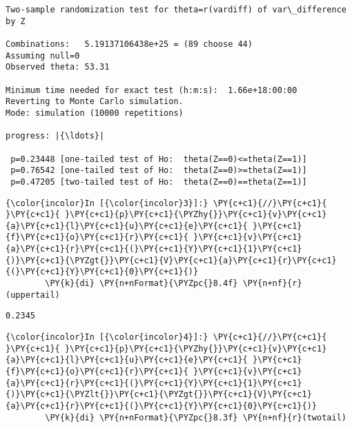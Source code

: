 \documentclass[11pt,notitlepage]{article}\usepackage[]{graphicx}\usepackage[]{color}
\makeatletter
\newenvironment{kframe}{%
 \def\at@end@of@kframe{}%
 \ifinner\ifhmode%
  \def\at@end@of@kframe{\end{minipage}}%
  \begin{minipage}{\columnwidth}%
 \fi\fi%
 \def\FrameCommand##1{\hskip\@totalleftmargin \hskip-\fboxsep
 \colorbox{shadecolor}{##1}\hskip-\fboxsep
     \hskip-\linewidth \hskip-\@totalleftmargin \hskip\columnwidth}%
 \MakeFramed {\advance\hsize-\width
   \@totalleftmargin\z@ \linewidth\hsize
   \@setminipage}}%
 {\par\unskip\endMakeFramed%
 \at@end@of@kframe}
\newenvironment{knitrout}{}{} %
\makeatother
\begin{document}
\begin{enumerate}[a)]
\begin{knitrout}
\begin{kframe}
    \begin{Verbatim}[commandchars=\\\{\}]
Two-sample randomization test for theta=r(vardiff) of var\_difference by Z

Combinations:   5.19137106438e+25 = (89 choose 44)
Assuming null=0
Observed theta: 53.31

Minimum time needed for exact test (h:m:s):  1.66e+18:00:00
Reverting to Monte Carlo simulation.
Mode: simulation (10000 repetitions)

progress: |{\ldots}|

 p=0.23448 [one-tailed test of Ho:  theta(Z==0)<=theta(Z==1)]
 p=0.76542 [one-tailed test of Ho:  theta(Z==0)>=theta(Z==1)]
 p=0.47205 [two-tailed test of Ho:  theta(Z==0)==theta(Z==1)]

    \end{Verbatim}

    \begin{Verbatim}[commandchars=\\\{\}]
{\color{incolor}In [{\color{incolor}3}]:} \PY{c+c1}{//}\PY{c+c1}{ }\PY{c+c1}{ }\PY{c+c1}{p}\PY{c+c1}{\PYZhy{}}\PY{c+c1}{v}\PY{c+c1}{a}\PY{c+c1}{l}\PY{c+c1}{u}\PY{c+c1}{e}\PY{c+c1}{ }\PY{c+c1}{f}\PY{c+c1}{o}\PY{c+c1}{r}\PY{c+c1}{ }\PY{c+c1}{v}\PY{c+c1}{a}\PY{c+c1}{r}\PY{c+c1}{(}\PY{c+c1}{Y}\PY{c+c1}{1}\PY{c+c1}{)}\PY{c+c1}{\PYZgt{}}\PY{c+c1}{V}\PY{c+c1}{a}\PY{c+c1}{r}\PY{c+c1}{(}\PY{c+c1}{Y}\PY{c+c1}{0}\PY{c+c1}{)}
        \PY{k}{di} \PY{n+nFormat}{\PYZpc{}8.4f} \PY{n+nf}{r}(uppertail)
\end{Verbatim}

    \begin{Verbatim}[commandchars=\\\{\}]
  0.2345

    \end{Verbatim}

    \begin{Verbatim}[commandchars=\\\{\}]
{\color{incolor}In [{\color{incolor}4}]:} \PY{c+c1}{//}\PY{c+c1}{ }\PY{c+c1}{ }\PY{c+c1}{p}\PY{c+c1}{\PYZhy{}}\PY{c+c1}{v}\PY{c+c1}{a}\PY{c+c1}{l}\PY{c+c1}{u}\PY{c+c1}{e}\PY{c+c1}{ }\PY{c+c1}{f}\PY{c+c1}{o}\PY{c+c1}{r}\PY{c+c1}{ }\PY{c+c1}{v}\PY{c+c1}{a}\PY{c+c1}{r}\PY{c+c1}{(}\PY{c+c1}{Y}\PY{c+c1}{1}\PY{c+c1}{)}\PY{c+c1}{\PYZlt{}}\PY{c+c1}{\PYZgt{}}\PY{c+c1}{V}\PY{c+c1}{a}\PY{c+c1}{r}\PY{c+c1}{(}\PY{c+c1}{Y}\PY{c+c1}{0}\PY{c+c1}{)}
        \PY{k}{di} \PY{n+nFormat}{\PYZpc{}8.3f} \PY{n+nf}{r}(twotail)
\end{Verbatim}


\end{kframe}
\end{knitrout}
\end{enumerate}
\end{document}
